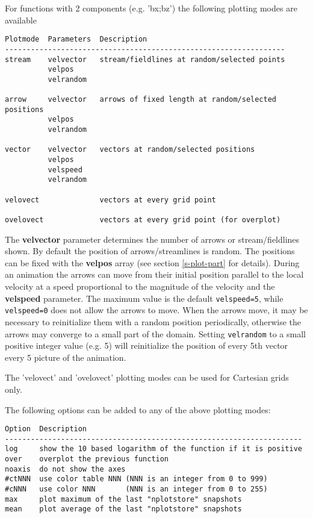 \documentclass{article}
\begin{document}
For functions with 2 components (e.g. 'bx;bz') the following plotting
modes are available
\begin{verbatim}
Plotmode  Parameters  Description
-----------------------------------------------------------------
stream    velvector   stream/fieldlines at random/selected points
          velpos  
          velrandom

arrow     velvector   arrows of fixed length at random/selected positions
          velpos
          velrandom

vector    velvector   vectors at random/selected positions
          velpos  
          velspeed
          velrandom

velovect              vectors at every grid point

ovelovect             vectors at every grid point (for overplot)
\end{verbatim}
The {\bf velvector} parameter determines the number of arrows or
stream/fieldlines shown. By default the position of arrows/streamlines
is random. The positions can be fixed with the {\bf velpos} array
(see section \ref{s-plot-part} for details). 
During an animation the arrows can move from their initial position
parallel to the local velocity at a speed proportional to the magnitude
of the velocity and the {\bf velspeed} parameter. The maximum value
is the default {\tt velspeed=5}, while {\tt velspeed=0} does not allow
the arrows to move. When the arrows move, it may be necessary to 
reinitialize them with a random position periodically, otherwise the 
arrows may converge to a small part of the domain. Setting {\tt velrandom}
to a small positive integer value (e.g. 5) will reinitialize the
position of every 5th vector every 5 picture of the animation.

The 'velovect' and 'ovelovect' plotting modes 
can be used for Cartesian grids only.

The following options can be added to any of the above plotting modes:
\begin{verbatim}
Option  Description
---------------------------------------------------------------------
log     show the 10 based logarithm of the function if it is positive
over    overplot the previous function
noaxis  do not show the axes
#ctNNN  use color table NNN (NNN is an integer from 0 to 999)
#cNNN   use color NNN       (NNN is an integer from 0 to 255)
max     plot maximum of the last "nplotstore" snapshots
mean    plot average of the last "nplotstore" snapshots
\end{verbatim}
\end{document}
